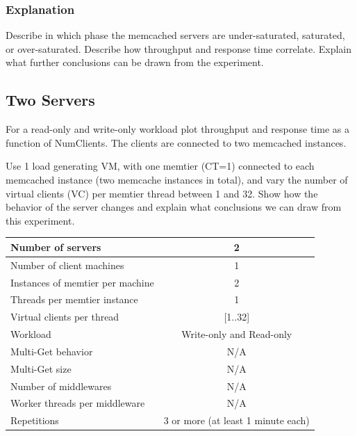 \documentclass[11pt,a4paper]{article}
\begin{document}
\subsubsection{Explanation}

Describe in which phase the memcached servers are under-saturated, saturated, or over-saturated. Describe how throughput and response time correlate. Explain what further conclusions can be drawn from the experiment.


\subsection{Two Servers}

For a read-only and write-only workload plot throughput and response time as a function of NumClients. The clients are connected to two memcached instances.

Use 1 load generating VM, with one memtier (CT=1) connected to each memcached instance (two memcache instances in total), and vary the number of virtual clients (VC) per memtier thread between 1 and 32. Show how the behavior of the server changes and explain what conclusions we can draw from this experiment.

\begin{center}
	\scriptsize{
		\begin{tabular}{|l|c|}
			\hline Number of servers                & 2                        \\
			\hline Number of client machines        & 1                        \\
			\hline Instances of memtier per machine & 2                        \\
			\hline Threads per memtier instance     & 1                        \\
			\hline Virtual clients per thread       & [1..32]                  \\
			\hline Workload                         & Write-only and Read-only \\
			\hline Multi-Get behavior               & N/A                      \\
			\hline Multi-Get size                   & N/A                      \\
			\hline Number of middlewares            & N/A                      \\
			\hline Worker threads per middleware    & N/A                      \\
			\hline Repetitions                      & 3 or more (at least 1 minute each)                \\
			\hline
		\end{tabular}
	}
\end{center}
\end{document}
